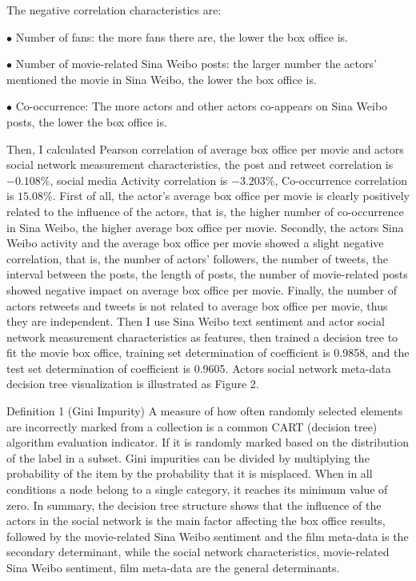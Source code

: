 \documentclass[review]{cvpr}
\begin{document}
The negative correlation characteristics are:
\par$\bullet$ Number of fans: the more fans there are, the lower the box office is.
\par$\bullet$ Number of movie-related Sina Weibo posts: the larger number the actors' mentioned the movie in Sina Weibo, the lower the box office is.
\par$\bullet$ Co-occurrence: The more actors and other actors co-appears on Sina Weibo posts, the lower the box office is.
\par Then, I calculated Pearson correlation of average box office per movie and actors social network measurement characteristics, the post and retweet correlation is $-0.108\%$, social media Activity correlation is $-3.203\%$, Co-occurrence correlation is $15.08\%$.
First of all, the actor's average box office per movie is clearly positively related to the influence of the actors, that is, the higher number of co-occurrence in Sina Weibo, the higher average box office per movie.
Secondly, the actors Sina Weibo activity and the average box office per movie showed a slight negative correlation, that is, the number of actors' followers, the number of tweets, the interval between the posts, the length of posts, the number of movie-related posts showed negative impact on average box office per movie.
Finally, the number of actors retweets and tweets is not related to average box office per movie, thus they are independent.
Then I use Sina Weibo text sentiment and actor social network measurement characteristics as features, then trained a decision tree to fit the movie box office, training set determination of coefficient is 0.9858, and the test set determination of coefficient is 0.9605.
Actors social network meta-data decision tree visualization is illustrated as Figure 2.
\par Definition 1 (Gini Impurity)  A measure of how often randomly selected elements are incorrectly marked from a collection is a common CART (decision tree) algorithm evaluation indicator.
If it is randomly marked based on the distribution of the label in a subset.
Gini impurities can be divided by multiplying the probability of the item by the probability that it is misplaced.
When in all conditions a node belong to a single category, it reaches its minimum value of zero.
In summary, the decision tree structure shows that the influence of the actors in the social network is the main factor affecting the box office results, followed by the movie-related Sina Weibo sentiment and the film meta-data is the secondary determinant,
while the social network characteristics, movie-related Sina Weibo sentiment, film meta-data are the general determinants.
\end{document}
